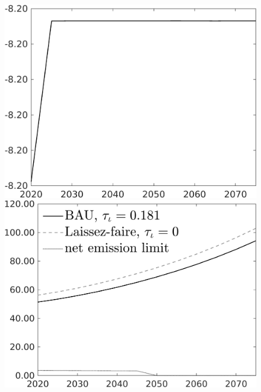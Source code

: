 \documentclass[12pt]{article}
\begin{document}
\begin{figure}[h!!]
\begin{minipage}[]{0.32\textwidth}
	\end{minipage}	
	\begin{minipage}[]{0.32\textwidth}
		\includegraphics[width=1\textwidth]{../../codding_model/own_basedOnFried/optimalPol_010922_revision/figures/all_13Sept22/CompTaul_LFBAUPer_Reg0_C_spillover0_nsk1_xgr1_knspil0_sep1_countec0_GovRev0_etaa0.79.png}
	\end{minipage}	
	\begin{minipage}[]{0.32\textwidth}
		\includegraphics[width=1\textwidth]{../../codding_model/own_basedOnFried/optimalPol_010922_revision/figures/all_13Sept22/CompTaul_LFBAU_Reg0_Emnet_spillover0_nsk1_xgr1_knspil0_sep1_countec0_GovRev0_etaa0.79_lgd1.png}

\end{minipage}
\end{figure}
\end{document}
